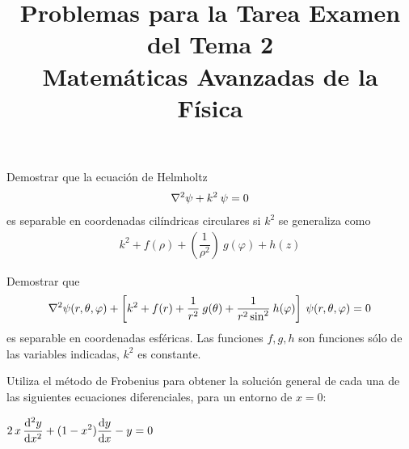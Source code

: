 
\title{Problemas para  la Tarea Examen del Tema 2 \\ \large{Matemáticas Avanzadas de la Física}\vspace{-8ex}}
\date{ }

\vspace{-4cm}
\renewcommand\labelenumii{\theenumi.{\arabic{enumii}}}
\maketitle
\fontsize{14}{14}\selectfont
\begin{milista}
\item Demostrar que la ecuación de Helmholtz
\begin{align*}
\laplacian \psi + k^{2} \: \psi = 0
\end{align*}
es separable en coordenadas cilíndricas circulares si $k^{2}$ se generaliza como
\begin{align*}
k^{2} + f(\rho) + \left( \dfrac{1}{\rho^{2}} \right) \: g(\varphi) + h(z)
\end{align*}
\item Demostrar que
\begin{align*}
\laplacian \psi (r, \theta, \varphi) + \left[ k^{2} + f(r) + \dfrac{1}{r^{2}} \: g(\theta) + \dfrac{1}{r^{2} \sin^{2}} \: h(\varphi) \right] \: \psi (r, \theta, \varphi) = 0
\end{align*}
es separable en coordenadas esféricas. Las funciones $f, g, h$ son funciones sólo de las variables indicadas, $k^{2}$ es constante.
\item Utiliza el método de Frobenius para obtener la solución general de cada una de las siguientes ecuaciones diferenciales, para un entorno de $x = 0$:
\begin{milista}
\begin{fleqn}
\setlength\itemsep{1em}
\item  $ \displaystyle 2 \, x \, \dv[2]{y}{x} + (1 - x^{2}) \dv{y}{x} - y = 0 $

\end{fleqn}
\end{milista}
\end{milista}
